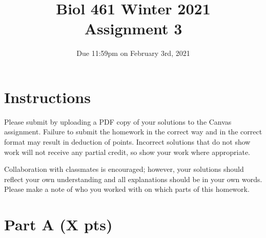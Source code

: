 \documentclass{article}
\title{Biol 461 Winter 2021\\ Assignment 3}
\author{Due 11:59pm on February 3rd, 2021}
\date{}
\begin{document}
\maketitle

\section*{Instructions}

Please submit by uploading a PDF copy of your solutions to the Canvas assignment. 
Failure to submit the homework in the correct way and in the correct format may result in deduction of points. 
Incorrect solutions that do not show work will not receive any partial credit, so show your work where appropriate.

Collaboration with classmates is encouraged; however, your solutions should reflect your own understanding and all explanations should be in your own words. 
Please make a note of who you worked with on which parts of this homework.

\section*{Part A (X pts)}
\end{document}
